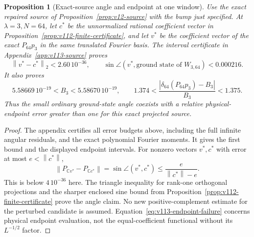 \documentclass[11pt]{article}
\newtheorem{proposition}[theorem]{Proposition}
\theoremstyle{remark}
\newcommand{\norm}[1]{\left\lVert #1\right\rVert}
\begin{document}
\begin{proposition}[Exact-source angle and endpoint at one window]
\label{prop:v113-source-certificate}
Use the exact repaired source of Proposition~\ref{prop:v12-source}
with the bump just specified. At $\lambda=3,N=64$, let $c^*$ be the
unnormalized rational coefficient vector in
Proposition~\ref{prop:v112-finite-certificate}, and let $v^*$ be the
coefficient vector of the exact $P_{64}p_3$ in the same translated
Fourier basis. The interval certificate in
Appendix~\ref{app:v113-source} proves
\[
 \norm{v^*-c^*}_2<2.60\,10^{-36},\qquad
 \sin\angle(v^*,\text{ground state of }W_{3,64})<0.000216.
\]
It also proves
\begin{equation}\label{eq:v113-endpoint-failure}
 5.58669\,10^{-19}<B_3<5.58670\,10^{-19},\qquad
 1.374<\frac{|\delta_{64}(P_{64}p_3)-B_3|}{B_3}<1.375.
\end{equation}
Thus the small ordinary ground-state angle coexists with a relative
physical-endpoint error greater than one for this exact projected source.
\end{proposition}
\begin{proof}
The appendix certifies all error budgets above, including the full
infinite angular residuals, and the exact polynomial Fourier moments.
It gives the first bound and the displayed endpoint intervals.
For nonzero vectors $v^*,c^*$ with error at most $e<\norm{c^*}$,
\[
 \norm{P_{\mathbb Cv^*}-P_{\mathbb Cc^*}}
 =\sin\angle(v^*,c^*)\le\frac{e}{\norm{c^*}-e}.
\]
This is below $4\,10^{-36}$ here. The triangle inequality for rank-one
orthogonal projections and the sharper enclosed sine bound from
Proposition~\ref{prop:v112-finite-certificate} prove the angle claim.
No new positive-complement estimate for the perturbed candidate is
assumed. Equation~\eqref{eq:v113-endpoint-failure} concerns physical
endpoint evaluation, not the equal-coefficient functional without its
$L^{-1/2}$ factor.
\end{proof}
\end{document}
